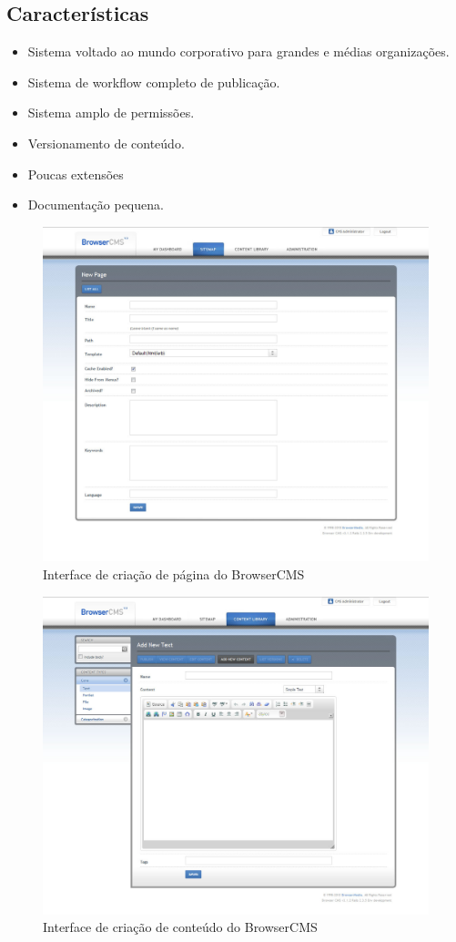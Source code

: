 \subsection{Características}

\begin{itemize}
  \item Sistema voltado ao mundo corporativo para grandes e médias organizações.
  \item Sistema de workflow completo de publicação.
  \item Sistema amplo de permissões.
  \item Versionamento de conteúdo.
  \item Poucas extensões 
  \item Documentação pequena.
\end{itemize}

\begin{figure}[here]
\includegraphics[width=150mm]{images/browser_cms_new_page.jpg}
\caption{Interface de criação de página do BrowserCMS}
\label{fig:browsercms_new_page.png}
\end{figure}

\begin{figure}[here]
\includegraphics[width=150mm]{images/browser_cms_new_content.jpg}
\caption{Interface de criação de conteúdo do BrowserCMS}
\label{fig:browsercms_new_content.png}
\end{figure}


